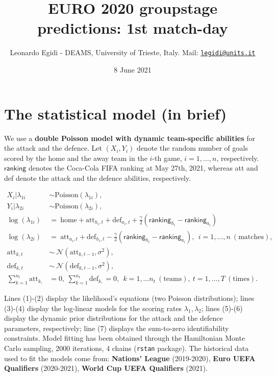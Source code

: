 \documentclass[10pt,]{article}
\title{EURO 2020 groupstage predictions: 1st match-day}
\author{Leonardo Egidi - DEAMS, University of Trieste, Italy. Mail:
\href{mailto:legidi@units.it}{\nolinkurl{legidi@units.it}}}
\institute{University of Trieste}
\date{8 June 2021}
\begin{document}
\maketitle

{
\setcounter{tocdepth}{2}
\tableofcontents
}
\section{The statistical model (in
brief)}\label{the-statistical-model-in-brief}

We use a \textbf{double Poisson model with dynamic team-specific
abilities} for the attack and the defence. Let \((X_{i}, Y_{i})\) denote
the random number of goals scored by the home and the away team in the
\(i\)-th game, \(i=1,\ldots,n\), respectively. \(\mathsf{ranking}\)
denotes the Coca-Cola FIFA ranking at May 27th, 2021, whereas att and
def denote the attack and the defence abilities, respectively.

\begin{align}
X_i| \lambda_{1i} &\sim \text{Poisson}(\lambda_{1i}),\\
Y_i|\lambda_{2i} &\sim \text{Poisson}(\lambda_{2i}),  \\
\log(\lambda_{1i}) &=\  \text{home} + \text{att}_{h_i, t}+ \text{def}_{a_i,t} + \frac{\gamma}{2}(\mathsf{ranking}_{h_i}-\mathsf{ranking}_{a_i}) \\
\log(\lambda_{2i}) & =\    \text{att}_{a_i,t} + \text{def}_{h_i,t} - \frac{\gamma}{2}(\mathsf{ranking}_{h_i}-\mathsf{ranking}_{a_i}), \ \ i=1,\ldots,n\ (\text{matches}), \\
\text{att}_{k, t} &\sim \ \mathcal{N}(\text{att}_{k, t-1}, \sigma^2), \\
\text{def}_{k, t} &\sim \  \mathcal{N}(\text{def}_{k, t-1}, \sigma^2),\\
\sum_{k=1}^{n_t} \text{att}_{k, }&=0, \  \sum_{k=1}^{n_t}\text{def}_{k, }=0, \ \ k=1,\ldots n_t \ (\text{teams}), \  t=1,\ldots, T \ (\text{times}).
\label{eq:scoring_rue}
\end{align}

Lines (1)-(2) display the likelihood's equations (two Poisson
distributions); lines (3)-(4) display the log-linear models for the
scoring rates \(\lambda_{1}, \lambda_{2}\); lines (5)-(6) display the
dynamic prior distributions for the attack and the defence parameters,
respectively; line (7) displays the sum-to-zero identifiability
constraints. Model fitting has been obtained through the Hamiltonian
Monte Carlo sampling, 2000 iterations, 4 chains (\texttt{rstan}
package). The historical data used to fit the models come from:
\textbf{Nations' League} (2019-2020), \textbf{Euro UEFA Qualifiers}
(2020-2021), \textbf{World Cup UEFA Qualifiers} (2021).
\end{document}
